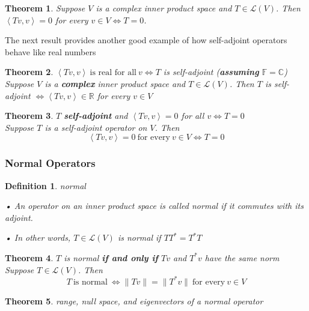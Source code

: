 \documentclass{article}
\newtheorem{theorem}{Theorem}[subsection]
\newtheorem{definition}{Definition}[subsection]
\newcommand{\RR}{\mathbb{R}}
\newcommand{\CC}{\mathbb{C}}
\newcommand{\FF}{\mathbb{F}}
\begin{document}
\begin{CJK}{UTF8}{gkai}
\begin{theorem}
    Suppose $V$ is a complex inner product space and $T \in \mathcal{L}(V)$. Then $\left<Tv,v\right> = 0$ for every $v \in V \Leftrightarrow T = 0$.
\end{theorem}

The next result provides another good example of how self-adjoint operators behave like real numbers\\

\begin{theorem}
    $\left<Tv,v\right> ~\text{is real for all}~ v \Leftrightarrow T$ is self-adjoint (\textbf{assuming} $\FF = \CC$)\\

    Suppose $V$ is a \textbf{complex} inner product space and $T \in \mathcal{L}(V)$. Then $T$ is self-adjoint $\Leftrightarrow \left<Tv,v\right> \in \RR$ for every $v \in V$
\end{theorem}

\begin{theorem}
    $T$ \textbf{self-adjoint} and $\left<Tv,v\right> = 0$ for all $v \Leftrightarrow T = 0$\\

    Suppose $T$ is a self-adjoint operator on $V$. Then
    \[\left<Tv,v\right> = 0 ~\text{for every}~ v \in V \Leftrightarrow T = 0\]
\end{theorem}

\subsubsection{Normal Operators}

\begin{definition}
    normal

    • An operator on an inner product space is called normal if it commutes with its adjoint.

    • In other words, $T \in \mathcal{L}(V)$ is normal if $TT^\ast = T^\ast T$
\end{definition}

\begin{theorem}
    $T$ is normal \textbf{if and only if} $Tv$ and $T^\ast v$ have the same norm\\

    Suppose $T \in \mathcal{L}(V)$. Then
    \[T ~\text{is normal}~ \Leftrightarrow \|Tv\| = \|T^\ast v\| ~\text{for every}~ v \in V\]
\end{theorem}

\begin{theorem}
    range, null space, and eigenvectors of a normal operator\\


\end{theorem}
\end{CJK}
\end{document}
